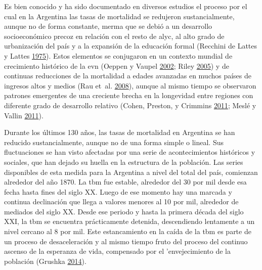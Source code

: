 \documentclass[12pt,spanish,]{article}
\begin{document}
Es bien conocido y ha sido documentado en diversos estudios el proceso
por el cual en la Argentina las tasas de mortalidad se redujeron
sustancialmente, aunque no de forma constante, merma que se debió a un
desarrollo socioeconómico precoz en relación con el resto de \gls{alyc},
al alto grado de urbanización del país y a la expansión de la educación
formal (Recchini de Lattes y Lattes
\protect\hyperlink{ref-RecchinideLattes1975}{1975}). Estos elementos se
conjugaron en un contexto mundial de crecimiento histórico de la
\gls{evn} (Oeppen y Vaupel
\protect\hyperlink{ref-OeppenVaupel2002}{2002}; Riley
\protect\hyperlink{ref-Riley2005}{2005}) y de continuas reducciones de
la mortalidad a edades avanzadas en muchos países de ingresos altos y
medios (Rau et~al. \protect\hyperlink{ref-RauEtAl2008}{2008}), aunque al
mismo tiempo se observaron patrones emergentes de una creciente brecha
en la longevidad entre regiones con diferente grado de desarrollo
relativo (Cohen, Preston, y Crimmins
\protect\hyperlink{ref-CohenPrestonCrimmins2011}{2011}; Meslé y Vallin
\protect\hyperlink{ref-MesleVallin2011}{2011}).

Durante los últimos 130 años, las tasas de mortalidad en Argentina se
han reducido sustancialmente, aunque no de una forma simple o lineal.
Sus fluctuaciones se han visto afectadas por una serie de
acontecimientos históricos y sociales, que han dejado su huella en la
estructura de la población. Las series disponibles de esta medida para
la Argentina a nivel del total del país, comienzan alrededor del año
1870. La \gls{tbm} fue estable, alrededor del 30 por mil desde esa fecha
hasta fines del siglo XX. Luego de ese momento hay una marcada y
continua declinación que llega a valores menores al 10 por mil,
alrededor de mediados del siglo XX. Desde ese periodo y hasta la primera
década del siglo XXI, la \gls{tbm} se encuentra prácticamente detenida,
descendiendo lentamente a un nivel cercano al 8 por mil. Este
estancamiento en la caída de la \gls{tbm} es parte de un proceso de
desaceleración y al mismo tiempo fruto del proceso del continuo ascenso
de la esperanza de vida, compensado por el 'envejecimiento de la
población (Grushka \protect\hyperlink{ref-Grushka2014}{2014}).
\end{document}
